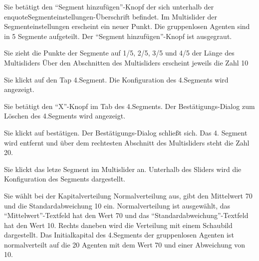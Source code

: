 \documentclass[parskip=full,11pt]{scrartcl}
\begin{document}
{Sie betätigt den \enquote{Segment hinzufügen}-Knopf der sich unterhalb der enquote{Segmenteinstellungen}-Überschrift befindet.}
{Im Multislider der Segmenteinstellungen erscheint ein neuer Punkt. Die gruppenlosen Agenten sind in 5 Segmente aufgeteilt. Der \enquote{Segment hinzufügen}-Knopf ist ausgegraut.}

{Sie zieht die Punkte der Segmente auf 1/5, 2/5, 3/5 und 4/5 der Länge des Multisliders}
{Über den Abschnitten des Multisliders erscheint jeweils die Zahl 10}

{Sie klickt auf den Tap 4.Segment.}
{Die Konfiguration des 4.Segments wird angezeigt.}

{Sie betätigt den \enquote{X}-Knopf im Tab des 4.Segments.}
{Der Bestätigungs-Dialog zum Löschen des 4.Segments wird angezeigt.}

{Sie klickt auf bestätigen.}
{Der Bestätigungs-Dialog schließt sich. Das 4. Segment wird entfernt und über dem rechtesten Abschnitt des Multisliders steht die Zahl 20.}

{Sie klickt das letze Segment im Multislider an.}
{Unterhalb des Sliders wird die Konfiguration des Segments dargestellt.}

{Sie wählt bei der Kapitalverteilung Normalverteilung aus, gibt den Mittelwert 70 und die Standardabweichung 10 ein.}
{Normalverteilung ist ausgewählt, das \enquote{Mittelwert}-Textfeld hat den Wert 70 und das \enquote{Standardabweichung}-Textfeld hat den Wert 10. Rechts daneben wird die Verteilung mit einem Schaubild dargestellt. Das Initialkapital des 4.Segments der gruppenlosen Agenten ist normalverteilt auf die 20 Agenten mit dem Wert 70 und einer Abweichung von 10.}
\end{document}
